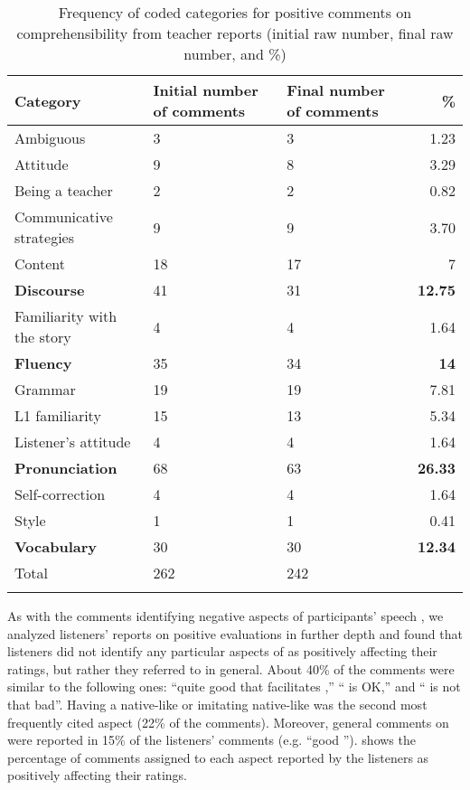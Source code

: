 \documentclass[output=paper]{langsci/langscibook}
\begin{document}
\begin{table}
\caption{Frequency of coded categories for positive comments on comprehensibility from teacher reports (initial raw number, final raw number, and \%)}
\label{tab:delrio:5}

\begin{tabularx}{\textwidth}{lYYr}
\lsptoprule
\bfseries Category & \bfseries Initial number of comments & \bfseries Final number of comments & \bfseries \%\\
\midrule
Ambiguous & 3 & 3 & 1.23\\
Attitude & 9 & 8 & 3.29\\
Being a teacher & 2 & 2 & 0.82\\
Communicative strategies & 9 & 9 & 3.70\\
Content & 18 & 17 & 7\\
\textbf{Discourse} & 41 & 31 & \textbf{12.75}\\
Familiarity with the story & 4 & 4 & 1.64\\
\textbf{Fluency} & 35 & 34 & \textbf{14}\\
Grammar & 19 & 19 & 7.81\\
L1 familiarity & 15 & 13 & 5.34\\
Listener’s attitude & 4 & 4 & 1.64\\
\textbf{Pronunciation} & 68 & 63 & \textbf{26.33}\\
Self-correction & 4 & 4 & 1.64\\
Style & 1 & 1 & 0.41\\
\textbf{Vocabulary} & 30 & 30 & \textbf{12.34}\\
\midrule 
Total & 262 & 242 & \\
\lspbottomrule
\end{tabularx}
\end{table}

\newpage 
As with the  comments identifying negative aspects of participants’ speech , we analyzed listeners’ reports on positive evaluations in further depth and found that listeners did not identify any particular aspects of  as positively affecting their  ratings, but rather they referred to  in general. About 40\% of the comments were similar to the following ones: “quite good  that facilitates ,” “ is OK,” and “ is not that bad”. Having a native-like  or imitating native-like  was the second most frequently cited aspect (22\% of the comments). Moreover, general comments on  were reported in 15\% of the listeners’ comments (e.g. “good ”).  shows the percentage of comments assigned to each  aspect reported by the listeners as positively affecting their  ratings.
\end{document}
